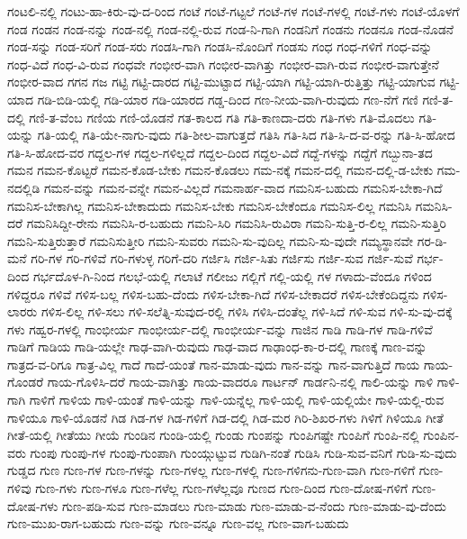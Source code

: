 {ಗಂಟಲಿ-ನಲ್ಲಿ
ಗಂಟು-ಹಾ-ಕಿರು-ವು-ದ-ರಿಂದ
ಗಂಟೆ
ಗಂಟೆ-ಗಟ್ಟಲೆ
ಗಂಟೆ-ಗಳ
ಗಂಟೆ-ಗಳಲ್ಲಿ
ಗಂಟೆ-ಗಳು
ಗಂಟೆ-ಯೊಳಗೆ
ಗಂಡ
ಗಂಡನ
ಗಂಡ-ನನ್ನು
ಗಂಡ-ನಲ್ಲಿ
ಗಂಡ-ನಲ್ಲಿ-ರುವ
ಗಂಡ-ನಿ-ಗಾಗಿ
ಗಂಡನಿಗೆ
ಗಂಡನು
ಗಂಡನೂ
ಗಂಡ-ನೊಡನೆ
ಗಂಡ-ಸನ್ನು
ಗಂಡ-ಸರಿಗೆ
ಗಂಡ-ಸರು
ಗಂಡಸಿ-ಗಾಗಿ
ಗಂಡಸಿ-ನೊಂದಿಗೆ
ಗಂಡಸು
ಗಂಧ
ಗಂಧ-ಗಳಿಗೆ
ಗಂಧ-ವನ್ನು
ಗಂಧ-ವಿದೆ
ಗಂಧ-ವಿ-ರುವ
ಗಂಧವೇ
ಗಂಭೀರ-ವಾಗಿ
ಗಂಭೀರ-ವಾಗಿತ್ತು
ಗಂಭೀರ-ವಾಗಿ-ರುವ
ಗಂಭೀರ-ವಾಗುತ್ತೇನೆ
ಗಂಭೀರ-ವಾದ
ಗಗನ
ಗಜ
ಗಟ್ಟಿ
ಗಟ್ಟಿ-ದಾರದ
ಗಟ್ಟಿ-ಮುಟ್ಟಾದ
ಗಟ್ಟಿ-ಯಾಗಿ
ಗಟ್ಟಿ-ಯಾಗಿ-ರುತ್ತಿತ್ತು
ಗಟ್ಟಿ-ಯಾಗುವ
ಗಟ್ಟಿ-ಯಾದ
ಗಡಿ-ಬಿಡಿ-ಯಲ್ಲಿ
ಗಡಿ-ಯಾರ
ಗಡಿ-ಯಾರದ
ಗಡ್ಡ-ದಿಂದ
ಗಣ-ನೀಯ-ವಾಗಿ-ರುವುದು
ಗಣ-ನೆಗೆ
ಗಣಿ
ಗಣಿ-ತ-ದಲ್ಲಿ
ಗಣಿ-ತ-ವೆಂಬ
ಗಣಿಯ
ಗಣಿ-ಯೊಡನೆ
ಗತ-ಕಾಲದ
ಗತಿ
ಗತಿ-ಕಾಣದಾ-ದರು
ಗತಿ-ಗಳು
ಗತಿ-ಮೊದಲು
ಗತಿ-ಯನ್ನು
ಗತಿ-ಯಲ್ಲಿ
ಗತಿ-ಯೇ-ನಾಗು-ವುದು
ಗತಿ-ಶೀಲ-ವಾಗುತ್ತದೆ
ಗತಿಸಿ
ಗತಿ-ಸಿದ
ಗತಿ-ಸಿ-ದ-ವ-ರನ್ನು
ಗತಿ-ಸಿ-ಹೋದ
ಗತಿ-ಸಿ-ಹೋದ-ವರ
ಗದ್ದಲ-ಗಳ
ಗದ್ದಲ-ಗಳಿಲ್ಲದೆ
ಗದ್ದಲ-ದಿಂದ
ಗದ್ದಲ-ವಿದೆ
ಗದ್ದೆ-ಗಳನ್ನು
ಗದ್ದೆಗೆ
ಗಬ್ಬುನಾ-ತದ
ಗಮನ
ಗಮನ-ಕೊಟ್ಟರೆ
ಗಮನ-ಕೊಡ-ಬೇಕು
ಗಮನ-ಕೊಡಲು
ಗಮ-ನಕ್ಕೆ
ಗಮನ-ದಲ್ಲಿ
ಗಮನ-ದಲ್ಲಿ-ಡ-ಬೇಕು
ಗಮ-ನದಲ್ಲಿಡಿ
ಗಮನ-ವನ್ನು
ಗಮನ-ವನ್ನೇ
ಗಮನ-ವಿಲ್ಲದೆ
ಗಮನಾರ್ಹ-ವಾದ
ಗಮನಿಸ-ಬಹುದು
ಗಮನಿಸ-ಬೇಕಾ-ಗಿದೆ
ಗಮನಿಸ-ಬೇಕಾಗಿಲ್ಲ
ಗಮನಿಸ-ಬೇಕಾದುದು
ಗಮನಿಸ-ಬೇಕು
ಗಮನಿಸ-ಬೇಕೆಂದೂ
ಗಮನಿಸ-ಲಿಲ್ಲ
ಗಮನಿಸಿ
ಗಮನಿಸಿ-ದರೆ
ಗಮನಿಸಿದ್ದೀ-ರೇನು
ಗಮನಿಸಿ-ರ-ಬಹುದು
ಗಮನಿ-ಸಿರಿ
ಗಮನಿಸಿ-ರುವಿರಾ
ಗಮನಿ-ಸುತ್ತಿ-ರ-ಲಿಲ್ಲ
ಗಮನಿ-ಸುತ್ತಿರಿ
ಗಮನಿ-ಸುತ್ತಿರುತ್ತಾರೆ
ಗಮನಿಸುತ್ತೀರಿ
ಗಮನಿ-ಸುವರು
ಗಮನಿ-ಸು-ವುದಿಲ್ಲ
ಗಮನಿ-ಸು-ವುದೇ
ಗಮ್ಯಸ್ಥಾನವೇ
ಗರ-ಡಿ-ಮನೆ
ಗರಿ-ಗಳ
ಗರಿ-ಗಳಿವೆ
ಗರಿ-ಗಳುಳ್ಳ
ಗರಿಗೆ-ದರಿ
ಗರ್ಜಿಸಿ
ಗರ್ಜಿ-ಸಿತು
ಗರ್ಜಿಸು
ಗರ್ಜಿ-ಸುವ
ಗರ್ಜಿ-ಸುವೆ
ಗರ್ಭ-ದಿಂದ
ಗರ್ಭದೊಳ-ಗಿ-ನಿಂದ
ಗಲಭೆ-ಯಲ್ಲಿ
ಗಲಾಟೆ
ಗಲೀಜು
ಗಲ್ಲಿಗೆ
ಗಲ್ಲಿ-ಯಲ್ಲಿ
ಗಳ
ಗಳಾದು-ವೆಂದೂ
ಗಳಿಂದ
ಗಳಿದ್ದರೂ
ಗಳಿವೆ
ಗಳಿಸ-ಬಲ್ಲ
ಗಳಿಸ-ಬಹು-ದೆಂದು
ಗಳಿಸ-ಬೇಕಾ-ಗಿದೆ
ಗಳಿಸ-ಬೇಕಾದರೆ
ಗಳಿಸ-ಬೇಕೆಂದಿದ್ದನು
ಗಳಿಸ-ಲಾರರು
ಗಳಿಸ-ಲಿಲ್ಲ
ಗಳಿ-ಸಲು
ಗಳಿ-ಸಲೆತ್ನಿ-ಸುವುದ-ರಲ್ಲಿ
ಗಳಿಸಿ
ಗಳಿಸಿ-ದಂತೆಲ್ಲ
ಗಳಿ-ಸಿದೆ
ಗಳಿ-ಸುವ
ಗಳಿ-ಸು-ವು-ದಕ್ಕೆ
ಗಳು
ಗಹ್ವರ-ಗಳಲ್ಲಿ
ಗಾಂಭೀರ್ಯ
ಗಾಂಭೀರ್ಯ-ದಲ್ಲಿ
ಗಾಂಭೀರ್ಯ-ವನ್ನು
ಗಾಜಿನ
ಗಾಡಿ
ಗಾಡಿ-ಗಳ
ಗಾಡಿ-ಗಳಿವೆ
ಗಾಡಿಗೆ
ಗಾಡಿಯ
ಗಾಡಿ-ಯಲ್ಲೇ
ಗಾಢ-ವಾಗಿ-ರುವುದು
ಗಾಢ-ವಾದ
ಗಾಢಾಂಧ-ಕಾ-ರ-ದಲ್ಲಿ
ಗಾಣಕ್ಕೆ
ಗಾಣ-ವನ್ನು
ಗಾತ್ರದ-ವ-ರಿಗೂ
ಗಾತ್ರ-ವಿಲ್ಲ
ಗಾದೆ
ಗಾದೆ-ಯಂತೆ
ಗಾನ-ಮಾಡು-ವುದು
ಗಾನ-ವನ್ನು
ಗಾನ-ವಾಗುತ್ತಿದೆ
ಗಾಯ
ಗಾಯ-ಗೊಂಡರೆ
ಗಾಯ-ಗೊಳಿಸಿ-ದರೆ
ಗಾಯ-ವಾಗಿತ್ತು
ಗಾಯ-ವಾದರೂ
ಗಾರ್ಟನ್
ಗಾರ್ಡನಿ-ನಲ್ಲಿ
ಗಾಲಿ-ಯನ್ನು
ಗಾಳಿ
ಗಾಳಿ-ಗಾಗಿ
ಗಾಳಿಗೆ
ಗಾಳಿಯ
ಗಾಳಿ-ಯಂತೆ
ಗಾಳಿ-ಯನ್ನು
ಗಾಳಿ-ಯನ್ನೆಲ್ಲ
ಗಾಳಿ-ಯಲ್ಲಿ
ಗಾಳಿ-ಯಲ್ಲಿಯೇ
ಗಾಳಿ-ಯಲ್ಲಿ-ರುವ
ಗಾಳಿಯೂ
ಗಾಳಿ-ಯೊಡನೆ
ಗಿಡ
ಗಿಡ-ಗಳ
ಗಿಡ-ಗಳಿಗೆ
ಗಿಡ-ದಲ್ಲಿ
ಗಿಡ-ಮರ
ಗಿರಿ-ಶಿಖರ-ಗಳು
ಗಿಳಿಗೆ
ಗಿಳಿಯೂ
ಗೀತೆ
ಗೀತೆ-ಯಲ್ಲಿ
ಗೀತೆಯು
ಗೀಯೆ
ಗುಂಡಿನ
ಗುಂಡಿ-ಯಲ್ಲಿ
ಗುಂಡು
ಗುಂಪನ್ನು
ಗುಂಪಿಗಷ್ಟೇ
ಗುಂಪಿಗೆ
ಗುಂಪಿ-ನಲ್ಲಿ
ಗುಂಪಿನ-ವರು
ಗುಂಪು
ಗುಂಪು-ಗಳ
ಗುಂಪು-ಗುಂಪಾಗಿ
ಗುಂಯ್ಗುಟ್ಟುವ
ಗುಡಿಗಿ-ನಂತೆ
ಗುಡಿಸಿ
ಗುಡಿ-ಸುವ-ವನಿಗೆ
ಗುಡಿ-ಸು-ವುದು
ಗುಡ್ಡದ
ಗುಣ
ಗುಣ-ಗಳ
ಗುಣ-ಗಳನ್ನು
ಗುಣ-ಗಳಲ್ಲ
ಗುಣ-ಗಳಲ್ಲಿ
ಗುಣ-ಗಳಿಗನು-ಗುಣ-ವಾಗಿ
ಗುಣ-ಗಳಿಗೆ
ಗುಣ-ಗಳಿವು
ಗುಣ-ಗಳು
ಗುಣ-ಗಳೂ
ಗುಣ-ಗಳೆಲ್ಲ
ಗುಣ-ಗಳೆಲ್ಲವೂ
ಗುಣದ
ಗುಣ-ದಿಂದ
ಗುಣ-ದೋಷ-ಗಳಿಗೆ
ಗುಣ-ದೋಷ-ಗಳು
ಗುಣ-ಪಡಿ-ಸುವ
ಗುಣ-ಮಾಡಲು
ಗುಣ-ಮಾಡು
ಗುಣ-ಮಾಡು-ವ-ನೆಂದು
ಗುಣ-ಮಾಡು-ವು-ದೆಂದು
ಗುಣ-ಮುಖ-ರಾಗ-ಬಹುದು
ಗುಣ-ವನ್ನು
ಗುಣ-ವನ್ನೂ
ಗುಣ-ವಲ್ಲ
ಗುಣ-ವಾಗ-ಬಹುದು
}
